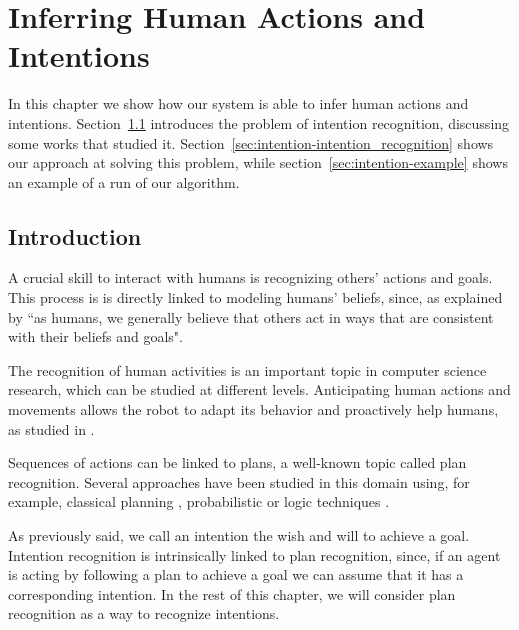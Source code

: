 \chapter{Inferring Human Actions and Intentions} %

\label{chapter:intention} %


In this chapter we show how our system is able to infer human actions and intentions. Section~\ref{sec:intention-intro} introduces the problem of intention recognition, discussing some works that studied it. Section~\ref{sec:intention-intention_recognition} shows our approach at solving this problem, while section~\ref{sec:intention-example} shows an example of a run of our algorithm.


\section{Introduction}
\label{sec:intention-intro}
A crucial skill to interact with humans is recognizing others' actions and goals. This process is is directly linked to modeling humans' beliefs, since, as explained by \cite{byom2013theory} ``as humans, we generally believe that others act in ways that are consistent with their beliefs and goals". 

The recognition of human activities is an important topic in computer science research, which can be studied at different levels. Anticipating human actions and movements allows the robot to adapt its behavior and proactively help humans, as studied in \cite{koppula2013anticipating}. 

Sequences of actions can be linked to plans, a well-known topic called plan recognition. Several approaches have been studied in this domain using, for example, classical planning \cite{ramirez2009plan}, probabilistic \cite{bui2003general} or logic techniques \cite{singla2011abductive}.

As previously said, we call an intention the wish and will to achieve a goal. Intention recognition is intrinsically linked to plan recognition, since, if an agent is acting by following a plan to achieve a goal we can assume that it has a corresponding intention. In the rest of this chapter, we will consider plan recognition as a way to recognize intentions. 


